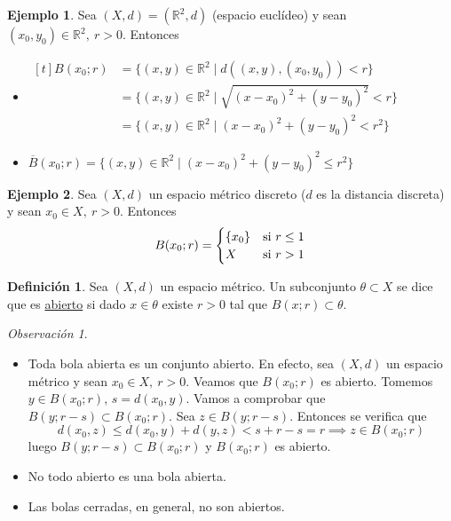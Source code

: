\documentclass[12pt]{report}
\theoremstyle{definition}
\newtheorem{definition}{Definición}[chapter]
\theoremstyle{definition}
\newtheorem{example}{Ejemplo}[chapter]
\theoremstyle{remark}
\newtheorem*{obs}{Observación} %
\newcommand{\R}{\mathbb R}
\begin{document}
\begin{example}
Sea $(X,d) = (\R^2,d)$ (espacio euclídeo) y sean $(x_0,y_0) \in \R^2, \ r > 0$. Entonces
\begin{itemize}
    \item
    $
        \begin{aligned}[t]
            B(x_0;r) &= \{(x,y) \in \R^2 \mid d((x,y),(x_0,y_0)) < r\} \\
            &= \{(x,y) \in \R^2 \mid \sqrt{(x-x_0)^2+(y-y_0)^2} < r\} \\
            &= \{(x,y) \in \R^2 \mid (x-x_0)^2+(y-y_0)^2<r^2\}
        \end{aligned}
    $    
    \item $\overline{B}(x_0;r) = \{(x,y) \in \R^2 \mid (x-x_0)^2+(y-y_0)^2 \leq r^2\}$
\end{itemize}
\end{example}

\begin{example}
Sea $(X,d)$ un espacio métrico discreto ($d$ es la distancia discreta) y sean $x_0 \in X, \ r>0$. Entonces
\[
B(x_0;r) =
\begin{cases}
\{x_0\} & $si$ \ r \leq 1 \\
X & $si$ \ r>1
\end{cases}
\]
\end{example}

\vspace{2mm}
\begin{definition}
Sea $(X,d)$ un espacio métrico. Un subconjunto $\theta \subset X$ se dice que es \underline{abierto} si dado $x \in \theta$ existe $r>0$ tal que $B(x;r) \subset \theta$.
\end{definition}
\begin{obs}
\hfill
\begin{itemize}
    \item Toda bola abierta es un conjunto abierto. En efecto, sea $(X,d)$ un espacio métrico y sean $x_0 \in X, \ r>0$. Veamos que $B(x_0;r)$ es abierto. Tomemos $y \in B(x_0;r)$, $s=d(x_0,y)$. Vamos a comprobar que $B(y;r-s) \subset B(x_0;r)$. Sea $z \in B(y;r-s)$. Entonces se verifica que
        \[d(x_0,z) \leq d(x_0,y)+d(y,z)<s+r-s=r \implies z \in B(x_0;r)\]
    luego $B(y;r-s) \subset B(x_0;r)$ y $B(x_0;r)$ es abierto.
    \item No todo abierto es una bola abierta.
    \item Las bolas cerradas, en general, no son abiertos.
\end{itemize}
\end{obs}
\end{document}
